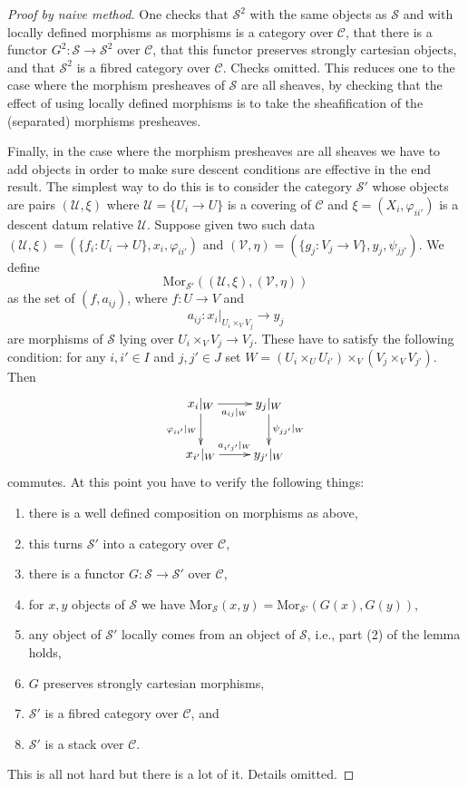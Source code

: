 \begin{proof}[Proof by naive method]
\medskip\noindent
One checks that $\mathcal{S}^2$ with the same objects as
$\mathcal{S}$ and with locally defined morphisms as morphisms
is a category over $\mathcal{C}$, that there is a functor
$G^2 : \mathcal{S} \to \mathcal{S}^2$ over $\mathcal{C}$,
that this functor preserves strongly cartesian objects,
and that $\mathcal{S}^2$ is a fibred category over $\mathcal{C}$.
Checks omitted. This reduces one to the case where the
morphism presheaves of $\mathcal{S}$ are all sheaves, by
checking that the effect of using locally defined morphisms
is to take the sheafification of the (separated) morphisms
presheaves.

\medskip\noindent
Finally, in the case where the morphism presheaves are all sheaves
we have to add objects in order to make sure descent conditions are
effective in the end result. The simplest way to do this is to
consider the category $\mathcal{S}'$ whose objects are
pairs $(\mathcal{U}, \xi)$ where
$\mathcal{U} = \{U_i \to U\}$ is a covering of $\mathcal{C}$ and
$\xi = (X_i, \varphi_{ii'})$ is a descent datum relative $\mathcal{U}$.
Suppose given two such data
$(\mathcal{U}, \xi) = (\{f_i : U_i \to U\},  x_i, \varphi_{ii'})$ and
$(\mathcal{V}, \eta) = (\{g_j : V_j \to V\},  y_j, \psi_{jj'})$.
We define
$$
\text{Mor}_{\mathcal{S}'}((\mathcal{U}, \xi), (\mathcal{V}, \eta))
$$
as the set of $(f, a_{ij})$, where $f : U \to V$ and
$$
a_{ij} :
x_i|_{U_i \times_V V_j}
\longrightarrow 
y_j
$$
are morphisms of $\mathcal{S}$ lying over $U_i \times_V V_j \to V_j$.
These have to satisfy the following condition: for any
$i, i' \in I$ and $j, j' \in J$ set 
$W = (U_i \times_U U_{i'}) \times_V (V_j \times_V V_{j'})$. Then
$$
\xymatrix{
x_i|_W \ar[r]_{a_{ij}|_W} \ar[d]_{\varphi_{ii'}|_W} &
y_j|_W \ar[d]^{\psi_{jj'}|_W} \\
x_{i'}|_W \ar[r]^{a_{i'j'}|_W} &
y_{j'}|_W
}
$$
commutes. At this point you have to verify the following things:
\begin{enumerate}
\item there is a well defined composition on morphisms as above,
\item this turns $\mathcal{S}'$ into a category over $\mathcal{C}$,
\item there is a functor $G : \mathcal{S} \to \mathcal{S}'$ over $\mathcal{C}$,
\item for $x, y$ objects of $\mathcal{S}$ we have
$\text{Mor}_{\mathcal{S}}(x, y) = \text{Mor}_{\mathcal{S}'}(G(x), G(y))$,
\item any object of $\mathcal{S}'$ locally comes from an object of
$\mathcal{S}$, i.e., part (2) of the lemma holds,
\item $G$ preserves strongly cartesian morphisms,
\item $\mathcal{S}'$ is a fibred category over $\mathcal{C}$, and
\item $\mathcal{S}'$ is a stack over $\mathcal{C}$.
\end{enumerate}
This is all not hard but there is a lot of it. Details omitted.
\end{proof}

